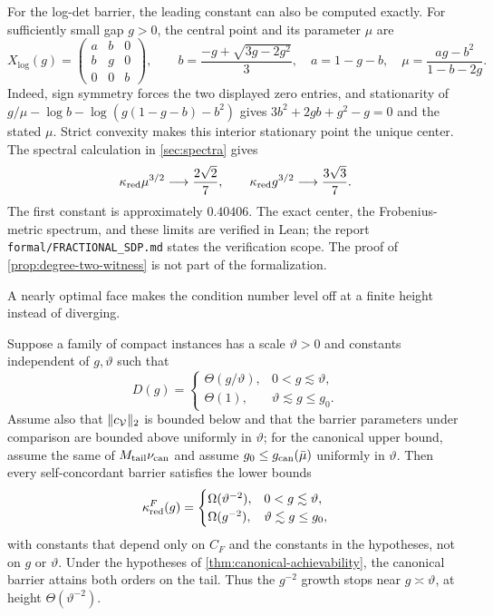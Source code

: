 For the log-det barrier, the leading constant can also be computed
exactly.  For sufficiently small gap $g>0$, the central point and its
parameter $\mu$ are
\[
 X_{\log}(g)=\begin{pmatrix}a&b&0\\b&g&0\\0&0&b\end{pmatrix},\qquad
 b=\frac{-g+\sqrt{3g-2g^2}}3,\quad a=1-g-b,\quad
 \mu=\frac{ag-b^2}{1-b-2g}.
\]
Indeed, sign symmetry forces the two displayed zero entries, and
stationarity of $g/\mu-\log b-\log(g(1-g-b)-b^2)$ gives
$3b^2+2gb+g^2-g=0$ and the stated $\mu$. Strict convexity makes
this interior stationary point the unique center. The spectral calculation
in \cref{sec:spectra} gives
\[
 \kappa_{\rm red}\mu^{3/2}\longrightarrow\frac{2\sqrt2}{7},
 \qquad
 \kappa_{\rm red}g^{3/2}\longrightarrow\frac{3\sqrt3}{7}.
\]
The first constant is approximately $0.40406$.  The exact center, the
Frobenius-metric spectrum, and these limits are verified in Lean; the report
\texttt{formal/FRACTIONAL\_SDP.md} states the verification scope.  The proof
of \cref{prop:degree-two-witness} is not part of the formalization.

A nearly optimal face makes the condition number level off at a finite
height instead of diverging.

\begin{corollary}
\label{cor:near-degeneracy-plateau}
Suppose a family of compact instances has a scale $\vartheta>0$ and constants
independent of $g,\vartheta$ such that
\begin{equation}
 D(g)=
 \begin{cases}
  \Theta(g/\vartheta),&0<g\lesssim\vartheta,\\
  \Theta(1),&\vartheta\lesssim g\leq g_0.
 \end{cases}
 \label{eq:near-face-diameter-law}
\end{equation}
Assume also that $\lVert c_{\mathcal V}\rVert_2$ is bounded below and that the
barrier parameters under comparison are bounded above uniformly in
$\vartheta$; for the canonical upper bound, assume the same of
$M_{\rm tail}\nu_{\rm can}$ and assume
$g_0\leq g_{\rm can}(\bar\mu)$ uniformly in $\vartheta$.
Then every self-concordant barrier satisfies the lower bounds
\begin{equation}
 \kappa_{\rm red}^{F}(g)=
 \begin{cases}
  \Omega(\vartheta^{-2}),&0<g\lesssim\vartheta,\\
  \Omega(g^{-2}),&\vartheta\lesssim g\leq g_0,
 \end{cases}
 \label{eq:near-face-floor}
\end{equation}
with constants that depend only on $C_F$ and the constants in the
hypotheses, not on $g$ or $\vartheta$.  Under the hypotheses of
\cref{thm:canonical-achievability}, the canonical barrier attains both orders
on the tail.  Thus the $g^{-2}$ growth stops near $g\asymp\vartheta$, at
height $\Theta(\vartheta^{-2})$.
\end{corollary}

